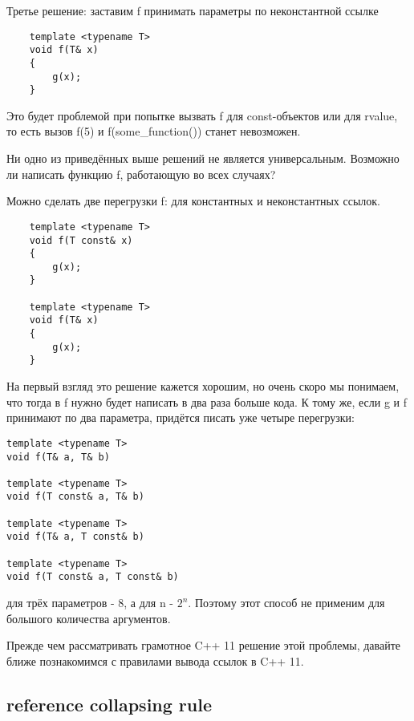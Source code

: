 	Третье решение: заставим f принимать параметры по неконстантной ссылке

	\begin{verbatim}
	template <typename T>
	void f(T& x)
	{
	    g(x);
	}
	\end{verbatim}

	Это будет проблемой при попытке вызвать f для const-объектов или для rvalue, то есть вызов f(5) и f(some\_function()) станет невозможен.

	Ни одно из приведённых выше решений не является универсальным. Возможно ли написать функцию f, работающую во всех случаях?

	Можно сделать две перегрузки f: для константных и неконстантных ссылок.

	\vspace{\baselineskip}

	\begin{verbatim}
	template <typename T>
	void f(T const& x)
	{
	    g(x);
	}

	template <typename T>
	void f(T& x)
	{
	    g(x);
	}
	\end{verbatim}

	На первый взгляд это решение кажется хорошим, но очень скоро мы понимаем, что тогда в f нужно будет написать в два раза больше кода. К тому же, если g и f принимают по два параметра, придётся писать уже четыре перегрузки:

\begin{verbatim}
template <typename T>
void f(T& a, T& b)

template <typename T>
void f(T const& a, T& b)

template <typename T>
void f(T& a, T const& b)

template <typename T>
void f(T const& a, T const& b)
\end{verbatim}

для трёх параметров - 8, а для n - $2^n$. Поэтому этот способ не применим для большого количества аргументов.

	Прежде чем рассматривать грамотное C++ 11 решение этой проблемы, давайте ближе познакомимся с правилами вывода ссылок в C++ 11.


\subsection{reference collapsing rule}

